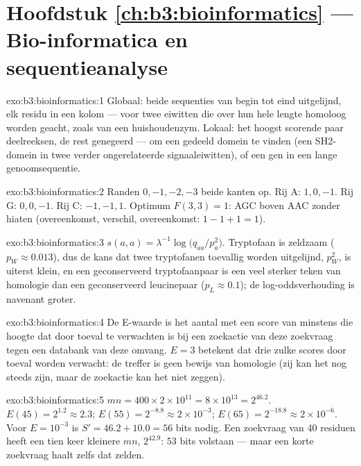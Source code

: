 \section*{Hoofdstuk \ref{ch:b3:bioinformatics} --- Bio-informatica en sequentieanalyse}

\begin{solution}{exo:b3:bioinformatics:1}
Globaal: beide sequenties van begin tot eind uitgelijnd, elk residu in
een kolom --- voor twee eiwitten die over hun hele lengte homoloog
worden geacht, zoals  van een huishoudenzym. Lokaal: het
hoogst scorende paar deelreeksen, de rest genegeerd --- om een gedeeld
domein te vinden (een SH2-domein in twee verder ongerelateerde
signaaleiwitten), of een gen in een lange genoomsequentie.
\end{solution}

\begin{solution}{exo:b3:bioinformatics:2}
Randen $0,-1,-2,-3$ beide kanten op. Rij A: $1, 0, -1$. Rij G: $0, 0, -1$.
Rij C: $-1, -1, 1$. Optimum $F(3,3) = 1$: AGC boven AAC zonder hiaten
(overeenkomst, verschil, overeenkomst: $1 - 1 + 1 = 1$).
\end{solution}

\begin{solution}{exo:b3:bioinformatics:3}
$s(a,a) = \lambda^{-1}\log\bigl(q_{aa}/p_{a}^{2}\bigr)$. Tryptofaan is
zeldzaam ($p_{W} \approx 0.013$), dus de kans dat twee tryptofanen
toevallig worden uitgelijnd, $p_{W}^{2}$, is uiterst klein, en een
geconserveerd tryptofaanpaar is een veel sterker teken van homologie
dan een geconserveerd leucinepaar ($p_{L}
\approx 0.1$); de log-oddsverhouding is navenant groter.
\end{solution}

\begin{solution}{exo:b3:bioinformatics:4}
De E-waarde is het aantal  met een score van minstens die
hoogte dat door toeval te verwachten is bij een zoekactie van deze
zoekvraag tegen een databank van deze omvang. $E = 3$ betekent dat drie
zulke scores door toeval worden verwacht: de treffer is geen bewijs van
homologie (zij kan het nog steeds zijn, maar de zoekactie kan het niet
zeggen).
\end{solution}

\begin{solution}{exo:b3:bioinformatics:5}
$mn = 400\times 2\times 10^{11} = 8\times 10^{13} = 2^{46.2}$. $E(45) =
2^{1.2} \approx 2.3$; $E(55) = 2^{-8.8} \approx 2\times 10^{-3}$;
$E(65) = 2^{-18.8} \approx 2\times 10^{-6}$. Voor $E = 10^{-3}$ is $S' =
46.2 + 10.0 = 56$ bits nodig. Een zoekvraag van \num{40} residuen heeft
een tien keer kleinere $mn$, $2^{42.9}$: $53$ bits volstaan --- maar een
korte zoekvraag haalt zelfs dat zelden.
\end{solution}

